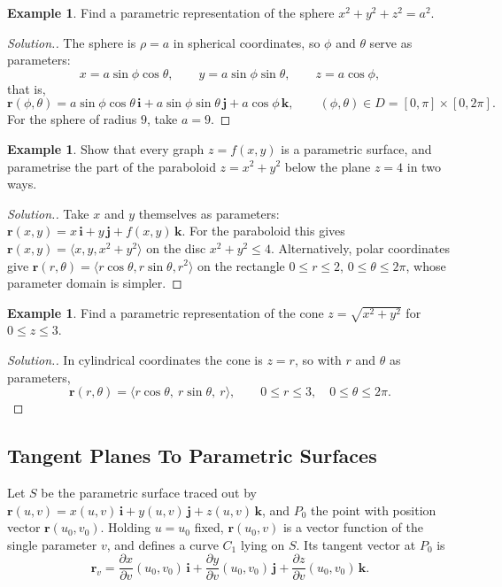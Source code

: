 \documentclass[11pt,a4paper]{article}
\theoremstyle{definition}
\newtheorem{exa}[thm]{Example}
\newenvironment{solution}
  {\renewcommand{\qedsymbol}{}\begin{proof}[\textit{Solution}.]}
  {\end{proof}}
\begin{document}
\begin{exa}
\label{ex:sphereparam}
Find a parametric representation of the sphere $x^2 + y^2 + z^2 = a^2$.
\end{exa}

\begin{solution}
The sphere is $\rho = a$ in spherical coordinates, so $\phi$ and $\theta$ serve
as parameters:
\[x = a\sin \phi \cos \theta , \qquad  y = a\sin \phi\sin \theta , \qquad  z =
a\cos \phi ,\]
that is,
\[\mathbf r(\phi, \theta) = a\sin \phi \cos \theta\, \mathbf i + a \sin \phi \sin
\theta\, \mathbf j + a\cos \phi \,\mathbf k ,\qquad (\phi,\theta)\in D =
[0,\pi]\times [0,2\pi] .\]
For the sphere of radius $9$, take $a = 9$.
\end{solution}

\begin{exa}
\label{ex:graphparam}
Show that every graph $z = f(x,y)$ is a parametric surface, and parametrise the
part of the paraboloid $z = x^2 + y^2$ below the plane $z = 4$ in two ways.
\end{exa}

\begin{solution}
Take $x$ and $y$ themselves as parameters: $\mathbf r(x,y) = x\,\mathbf i +
y\,\mathbf j + f(x,y)\,\mathbf k$. For the paraboloid this gives
$\mathbf r(x,y) = \langle x, y, x^2 + y^2\rangle$ on the disc $x^2 + y^2\leq 4$.
Alternatively, polar coordinates give
$\mathbf r(r,\theta) = \langle r\cos\theta, r\sin\theta, r^2\rangle$ on the
rectangle $0\leq r\leq 2$, $0\leq\theta\leq 2\pi$, whose parameter domain is
simpler.
\end{solution}

\begin{exa}
\label{ex:coneparam}
Find a parametric representation of the cone $z = \sqrt{x^2 + y^2}$ for
$0\leq z\leq 3$.
\end{exa}

\begin{solution}
In cylindrical coordinates the cone is $z = r$, so with $r$ and $\theta$ as
parameters,
\[\mathbf r(r,\theta) = \langle r\cos\theta,\ r\sin\theta,\ r\rangle ,\qquad
0\leq r\leq 3,\quad 0\leq\theta\leq 2\pi .\]
\end{solution}

{\color[wave]{485}\subsection{Tangent Planes To Parametric Surfaces}}

Let $S$ be the parametric surface traced out by
$\mathbf r(u,v) = x(u,v)\, \mathbf i + y(u,v)\,\mathbf j + z(u,v)\,\mathbf k$,
and $P_0$ the point with position vector $\mathbf r(u_0,v_0)$. Holding
$u = u_0$ fixed, $\mathbf r(u_0,v)$ is a vector function of the single
parameter $v$, and defines a curve $C_1$ lying on $S$. Its tangent vector at
$P_0$ is
\[\mathbf r_v = \frac{\partial x}{\partial v}(u_0,v_0)\,\mathbf i +
\frac{\partial y}{\partial v}(u_0,v_0)\,\mathbf j +\frac{\partial z}{\partial
v}(u_0,v_0)\,\mathbf k .\]
\end{document}

